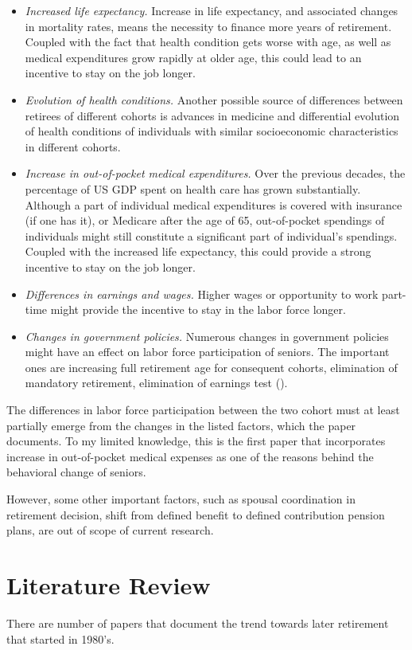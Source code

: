 \documentclass[
10pt, %
a4paper, %
oneside, %
headinclude,footinclude, %
BCOR5mm, %
]{scrartcl}
\begin{document}
\begin{itemize}
\item \textit{Increased life expectancy.} Increase in life expectancy, and associated changes in mortality rates, means the necessity to finance more years of retirement. Coupled with the fact that health condition gets worse with age, as well as medical expenditures grow rapidly at older age, this could lead to an incentive to stay on the job longer. 
\item \textit{Evolution of health conditions.} Another possible source of differences between retirees of different cohorts is advances in medicine and differential evolution of health conditions of individuals with similar socioeconomic characteristics in different cohorts.
\item \textit{Increase in out-of-pocket medical expenditures.} Over the previous decades, the percentage of US GDP spent on health care has grown substantially. Although a part of individual medical expenditures is covered with insurance (if one has it), or Medicare after the age of 65, out-of-pocket spendings of individuals might still constitute a significant part of individual's spendings. Coupled with the increased life expectancy, this could provide a strong incentive to stay on the job longer.
\item \textit{Differences in earnings and wages.} Higher wages or opportunity to work part-time might provide the incentive to stay in the labor force longer.
\item \textit{Changes in government policies.} Numerous changes in government policies might have an effect on labor force participation of seniors. The important ones are increasing full retirement age for consequent cohorts, elimination of mandatory retirement, elimination of earnings test (\cite{Clark2002}). 
\end{itemize}

The differences in labor force participation between the two cohort must at least partially emerge from the changes in the listed factors, which the paper documents. To my limited knowledge, this is the first paper that incorporates increase in out-of-pocket medical expenses as one of the reasons behind the behavioral change of seniors.

However, some other important factors, such as spousal coordination in retirement decision, shift from defined benefit to defined contribution pension plans, are out of scope of current research. 
 
\section{Literature Review}
There are number of papers that document the trend towards later retirement that started in 1980's.
\end{document}
